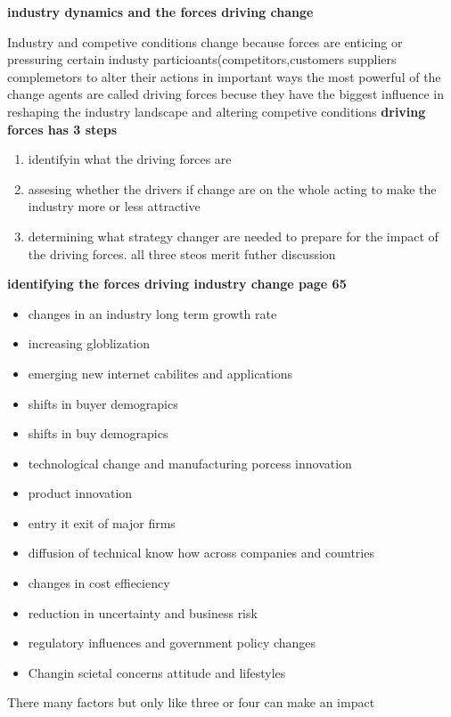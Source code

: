 \documentclass{report}
\begin{document}
{\huge\textbf{industry dynamics and the forces driving change}}


Industry and competive conditions change because forces are enticing or pressuring certain industy particioants(competitors,customers suppliers complemetors  to alter their actions  in important ways  the most powerful of the change agents are called driving forces becuse they have the biggest influence in reshaping  the industry  landscape and altering competive conditions 
\textbf{driving forces has 3 steps  }
\begin{enumerate}
\item identifyin what the driving forces are 
\item assesing whether the drivers if change are  on the whole acting to make the industry more or less attractive 
\item determining what strategy  changer are needed to prepare for the impact of the driving forces. all three steos merit futher discussion 
\end{enumerate}


{\huge\textbf{identifying the forces driving industry change page 65}}
\begin{itemize}
\item changes in an industry long term growth rate 
\item increasing globlization 
\item emerging new internet cabilites and applications 
\item shifts in buyer demograpics 
\item shifts in buy demograpics 

\item technological change and manufacturing porcess innovation 
\item product innovation 
\item entry it exit of major firms 
\item diffusion of technical know how across companies and countries 
\item changes in cost effieciency 
\item reduction in uncertainty and business risk 
\item regulatory influences  and government policy changes 
\item Changin scietal concerns attitude and lifestyles 

\end{itemize}

There many factors but only like three or four can make an impact 
\end{document}
